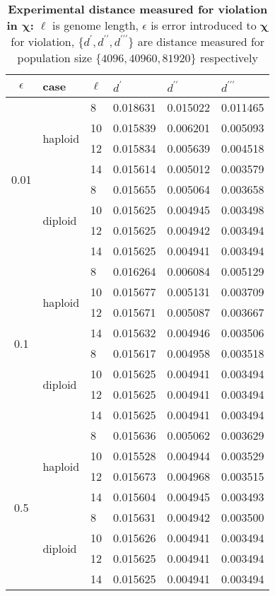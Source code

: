 \begin{table}[ht]
\caption{\textbf{Experimental distance measured for violation in $\bm{\chi}$:} $\ell$ is genome length, $\epsilon$ is error introduced to $\bm{\chi}$ for violation, $\{d^\prime, d^{\prime\prime}, d^{\prime\prime\prime}\}$ are distance measured for population size $\{4096, 40960, 81920\}$ respectively}
\centering
\begin{tabularx}{0.75\textwidth}{ c *{5}{X}}
\toprule
$\epsilon$ & case & $\ell$ & $d^\prime$ & $d^{\prime\prime}$ & $d^{\prime\prime\prime}$ \\
\midrule
\multirow{8}{*}{0.01} & \multirow{4}{*}{haploid} 	& 8 & 0.018631	& 0.015022 	& 0.011465 \\
		      &   				& 10 & 0.015839	& 0.006201 	& 0.005093 \\ 
		      & 			 	& 12 & 0.015834	&  0.005639	& 0.004518 \\
		      &  	 			& 14 & 0.015614	&  0.005012	& 0.003579 \\ 
		      \cmidrule(l){2-6}
		      & \multirow{4}{*}{diploid} 	& 8 & 0.015655	&  0.005064	& 0.003658 \\
		      &  	 			& 10 & 0.015625	&  0.004945	& 0.003498 \\
		      & 			 	& 12 & 0.015625	&  0.004942	& 0.003494 \\
		      &  	 			& 14 & 0.015625	&  0.004941	& 0.003494 \\
		      \midrule
\multirow{8}{*}{0.1} & \multirow{4}{*}{haploid} 	& 8 & 0.016264	& 0.006084 	& 0.005129 \\
		      &   				& 10 & 0.015677	&  0.005131	& 0.003709 \\	
		      & 				& 12 & 0.015671	&  0.005087	& 0.003667 \\	
		      &  	 			& 14 & 0.015632	&  0.004946	& 0.003506 \\
		      \cmidrule(l){2-6}
		      & \multirow{4}{*}{diploid} 	& 8 & 0.015617	&  0.004958	& 0.003518 \\
		      &  	 			& 10 & 0.015625	&  0.004941	& 0.003494 \\
		      & 				& 12 & 0.015625	&  0.004941	& 0.003494 \\
		      &  	 			& 14 & 0.015625	&  0.004941	& 0.003494 \\
		      \midrule
\multirow{8}{*}{0.5} & \multirow{4}{*}{haploid} 	& 8 & 0.015636	&  0.005062	& 0.003629 \\
		      &   				& 10 & 0.015528	&  0.004944	& 0.003529 \\
		      & 				& 12 & 0.015673	&  0.004968	& 0.003515 \\
		      &  	 			& 14 & 0.015604	&  0.004945	& 0.003493 \\
		      \cmidrule(l){2-6}
		      & \multirow{4}{*}{diploid} 	& 8 & 0.015631	&  0.004942	& 0.003500 \\	
		      &  	 			& 10 & 0.015626	&  0.004941	& 0.003494 \\
		      &  				& 12 & 0.015625	&  0.004941	& 0.003494 \\
		      &  	 			& 14 & 0.015625	&  0.004941	& 0.003494 \\
\bottomrule
\end{tabularx}
\label{distanceChi}
\end{table} 


